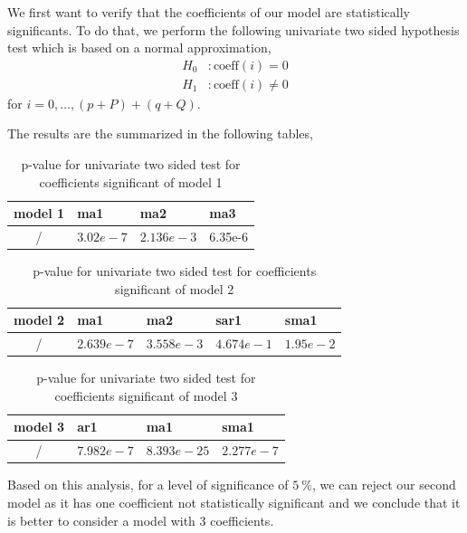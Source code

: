 We first want to verify that the coefficients of our model are statistically significants. To do that, we perform the following univariate two sided hypothesis test which is based on a normal approximation,
\begin{align*}
	H_0&: \text{coeff}(i) = 0 \\
	H_1&: \text{coeff}(i) \neq 0
\end{align*}
for $i = 0,\dots,(p + P) + (q + Q)$.

The results are the summarized in the following tables,
\begin{table}[H]
	\centering
	\begin{tabular}{|c|l|l|l|}
		\hline
		\textbf{model 1}    & ma1			& ma2			& ma3 \\\hline
		    /				& $3.02e-7$ 	& $2.136e-3$ 	& 6.35e-6 \\\hline
	\end{tabular}
	\caption{p-value for univariate two sided test for coefficients significant of model 1}
	\label{tab:coefficients-significance-model1}
\end{table}

\begin{table}[H]
	\centering
	\begin{tabular}{|c|l|l|l|l|}
		\hline
		\textbf{model 2}    & ma1			& ma2			& sar1		 & sma1		 \\\hline
		    /				& $2.639e-7$ 	& $3.558e-3$ 	& $4.674e-1$ & $1.95e-2$ \\\hline
	\end{tabular}
	\caption{p-value for univariate two sided test for coefficients significant of model 2}
	\label{tab:coefficients-significance-model2}
\end{table}

\begin{table}[H]
	\centering
	\begin{tabular}{|c|l|l|l|}
		\hline
		\textbf{model 3}    & ar1			& ma1			& sma1 \\\hline
		    /				& $7.982e-7$ 	& $8.393e-25$ 	& $2.277e-7$ \\\hline
	\end{tabular}
	\caption{p-value for univariate two sided test for coefficients significant of model 3}
	\label{tab:coefficients-significance-model3}
\end{table}

Based on this analysis, for a level of significance of $\SI{5}{\percent}$, we can reject our second model as it has one coefficient not statistically significant and we conclude that it is better to consider a model with $3$ coefficients.

